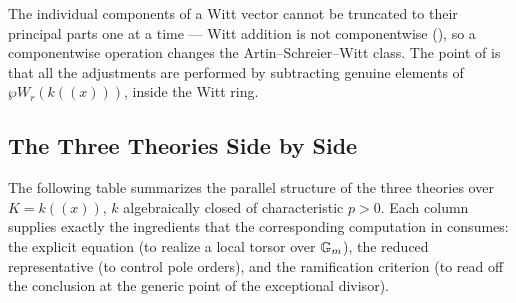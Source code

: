 \begin{rem*}
    The individual components of a Witt vector cannot be truncated to their principal
    parts one at a time --- Witt addition is not componentwise
    (), so a componentwise operation changes the
    Artin--Schreier--Witt class. The point of
     is that all the adjustments are
    performed by subtracting genuine elements of $\wp W_r(k((x)))$, inside the Witt
    ring.
\end{rem*}

\subsection*{The Three Theories Side by Side}

The following table summarizes the parallel structure of the three theories
over $K = k((x))$, $k$ algebraically closed of characteristic $p > 0$. Each
column supplies exactly the ingredients that the corresponding computation in
 consumes: the explicit equation
(to realize a local torsor over $\mathbb{G}_m$), the reduced representative (to
control pole orders), and the ramification criterion (to read off the
conclusion at the generic point of the exceptional divisor).

